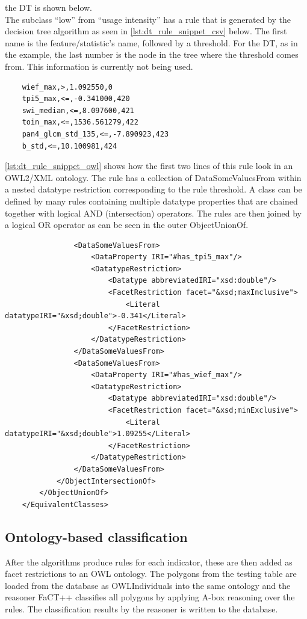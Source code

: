 \documentclass[authoryear, review,12pt,number]{elsarticle}
\begin{document}
the DT is shown below.
\\
The subclass ``low'' from ``usage intensity'' has a rule that is generated by
the decision tree algorithm as seen in \ref{lst:dt_rule_snippet_csv} below. 
The first name is the feature/statistic's name, followed by a threshold. For 
the DT, as in the example, the last number is the node in the tree where the 
threshold comes from. This information is currently not being used.
\label{lst:dt_rule_snippet_csv}
\begin{lstlisting}
    wief_max,>,1.092550,0
    tpi5_max,<=,-0.341000,420
    swi_median,<=,8.097600,421
    toin_max,<=,1536.561279,422
    pan4_glcm_std_135,<=,-7.890923,423
    b_std,<=,10.100981,424
\end{lstlisting}
\ref{lst:dt_rule_snippet_owl} shows how the first two 
lines of this rule look in an OWL2/XML ontology. The rule has a collection of 
DataSomeValuesFrom within a nested datatype restriction corresponding to the 
rule threshold. A class can be defined by many rules containing multiple 
datatype properties that are chained together with logical AND (intersection) 
operators. The rules are then joined by a logical OR operator as can be seen in 
the outer ObjectUnionOf.  
\label{lst:dt_rule_snippet_owl}
\begin{lstlisting}
                <DataSomeValuesFrom>
                    <DataProperty IRI="#has_tpi5_max"/>
                    <DatatypeRestriction>
                        <Datatype abbreviatedIRI="xsd:double"/>
                        <FacetRestriction facet="&xsd;maxInclusive">
                            <Literal datatypeIRI="&xsd;double">-0.341</Literal>
                        </FacetRestriction>
                    </DatatypeRestriction>
                </DataSomeValuesFrom>
                <DataSomeValuesFrom>
                    <DataProperty IRI="#has_wief_max"/>
                    <DatatypeRestriction>
                        <Datatype abbreviatedIRI="xsd:double"/>
                        <FacetRestriction facet="&xsd;minExclusive">
                            <Literal datatypeIRI="&xsd;double">1.09255</Literal>
                        </FacetRestriction>
                    </DatatypeRestriction>
                </DataSomeValuesFrom>
            </ObjectIntersectionOf>
        </ObjectUnionOf>
    </EquivalentClasses>
\end{lstlisting}
\subsection{Ontology-based classification}
\label{subsec:Onto_classification}
After the algorithms produce rules for each indicator, these are then added as 
facet restrictions to an OWL ontology. The polygons from the testing table are 
loaded from the database as OWLIndividuals into the same ontology and the 
reasoner FaCT++ classifies all polygons by applying A-box reasoning over the 
rules. The classification results by the reasoner is written to the database. 
\end{document}
